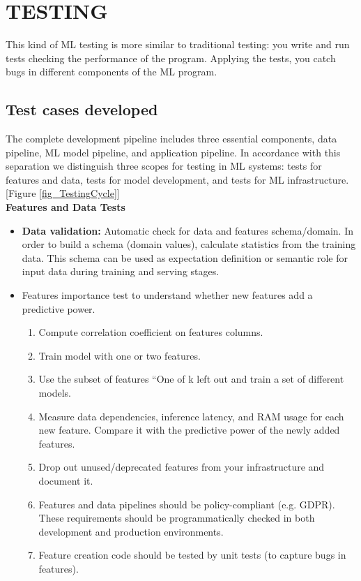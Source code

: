 \documentclass[12pt,oneside,a4paper]{report}
\begin{document}
\section{TESTING}
\fontsize{12pt}{10pt}\selectfont
\vspace{5.0mm}
This kind of ML testing is more similar to traditional testing: you write and run tests checking the performance of the program. Applying the tests, you catch bugs in different components of the ML program.
\subsection{Test cases developed}
\fontsize{12pt}{10pt}\selectfont
The complete development pipeline includes three essential components, data pipeline, ML model pipeline, and application pipeline. In accordance with this separation we distinguish three scopes for testing in ML systems: tests for features and data, tests for model development, and tests for ML infrastructure.[Figure \ref{fig_TestingCycle}]\\
\newpage
\Large{\textbf{Features and Data Tests}}\\
\fontsize{12pt}{10pt}\selectfont
\begin{itemize}
\item\textbf{Data validation:} Automatic check for data and features schema/domain. In order to build a schema (domain values), calculate statistics from the training data. This schema can be used as expectation definition or semantic role for input data during training and serving stages.
\item Features importance test to understand whether new features add a predictive power.
\begin{enumerate}

      	\item Compute correlation coefficient on features columns.
        \item Train model with one or two features.
        \item Use the subset of features “One of k left out and train a set of different models.
        \item Measure data dependencies, inference latency, and RAM usage for each new feature. Compare it with the predictive power of the newly added features.
        \item Drop out unused/deprecated features from your infrastructure and document it.

    \item Features and data pipelines should be policy-compliant (e.g. GDPR). These requirements should be programmatically checked in both development and production environments.
    \item Feature creation code should be tested by unit tests (to capture bugs in features).
\end{enumerate}
\end{itemize}
\end{document}
